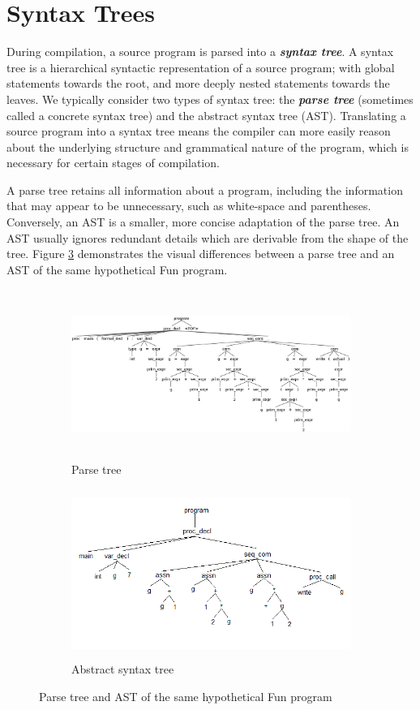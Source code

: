 \documentclass{l4proj}
\begin{document}
\section{Syntax Trees}
During compilation, a source program is parsed into a \textit{\textbf{syntax tree}}. A syntax tree is a hierarchical syntactic representation of a source program; with global statements towards the root, and more deeply nested statements towards the leaves. We typically consider two types of syntax tree: the \textit{\textbf{parse tree}} (sometimes called a concrete syntax tree) and the abstract syntax tree (AST). Translating a source program into a syntax tree means the compiler can more easily reason about the underlying structure and grammatical nature of the program, which is necessary for certain stages of compilation.

A parse tree retains all information about a program, including the information that may appear to be unnecessary, such as white-space and parentheses. Conversely, an AST is a smaller, more concise adaptation of the parse tree. An AST usually ignores redundant details which are derivable from the shape of the tree. Figure \ref{fig:parse-abstract-tree} demonstrates the visual differences between a parse tree and an AST of the same hypothetical Fun program. 

\begin{figure}[h]
	\begin{subfigure}[b]{0.5\textwidth}
		\includegraphics[height=5.5cm,width=\linewidth]{images/2-2a.png}
		\caption{Parse tree}
		\label{fig:ANTLR-parse-tree}
	\end{subfigure}
	\begin{subfigure}[b]{0.5\textwidth}
		\includegraphics[height=5.5cm,width=\linewidth]{images/2-2b.png}
		\caption{Abstract syntax tree}
		\label{fig:ANTLR-syntax-tree}
	\end{subfigure}
	\caption{Parse tree and AST of the same hypothetical Fun program}\label{fig:parse-abstract-tree}	
\end{figure}
\end{document}
